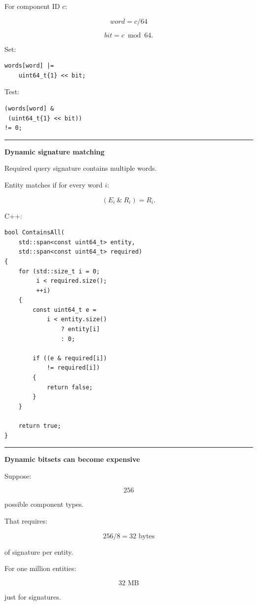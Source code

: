 For component ID \(c\):

\[
word=c/64
\]

\[
bit=c\bmod64.
\]

Set:

\begin{verbatim}
words[word] |=
    uint64_t{1} << bit;
\end{verbatim}

Test:

\begin{verbatim}
(words[word] &
 (uint64_t{1} << bit))
!= 0;
\end{verbatim}

\begin{center}\rule{0.5\linewidth}{0.5pt}\end{center}

\textbf{Dynamic signature matching}

Required query signature contains multiple words.

Entity matches if for every word \(i\):

\[
(E_i\ \&\ R_i)=R_i.
\]

C++:

\begin{verbatim}
bool ContainsAll(
    std::span<const uint64_t> entity,
    std::span<const uint64_t> required)
{
    for (std::size_t i = 0;
         i < required.size();
         ++i)
    {
        const uint64_t e =
            i < entity.size()
                ? entity[i]
                : 0;

        if ((e & required[i])
            != required[i])
        {
            return false;
        }
    }

    return true;
}
\end{verbatim}

\begin{center}\rule{0.5\linewidth}{0.5pt}\end{center}

\textbf{Dynamic bitsets can become expensive}

Suppose:

\[
256
\]

possible component types.

That requires:

\[
256/8=32\text{ bytes}
\]

of signature per entity.

For one million entities:

\[
32\text{ MB}
\]

just for signatures.

